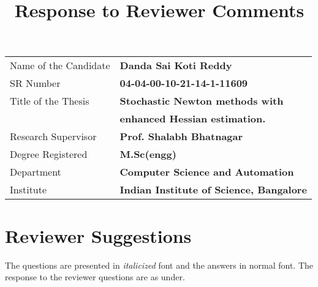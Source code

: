 \documentclass[12pt]{article}
\title{\textbf{Response to Reviewer Comments}}
\author{}
\date{}
\begin{document}
\maketitle
\begin{tabular}{ll}
Name of the Candidate & \textbf{Danda Sai Koti Reddy}\\ 
SR Number &\textbf{04-04-00-10-21-14-1-11609} \\
Title of the Thesis & \textbf{Stochastic Newton methods with   } \\
 & \textbf{ enhanced Hessian estimation.}\\
 Research Supervisor  & \textbf{Prof. Shalabh Bhatnagar} \\
Degree Registered  &  \textbf{M.Sc(engg)} \\
Department  & \textbf{Computer Science and Automation} \\
Institute  & \textbf{Indian Institute of Science, Bangalore }
\end{tabular}


\vspace{2cm}

\section{Reviewer Suggestions}
The questions are presented in \textit{italicized} font and the answers in normal font. The response to the reviewer questions are as under.\\
\end{document}

